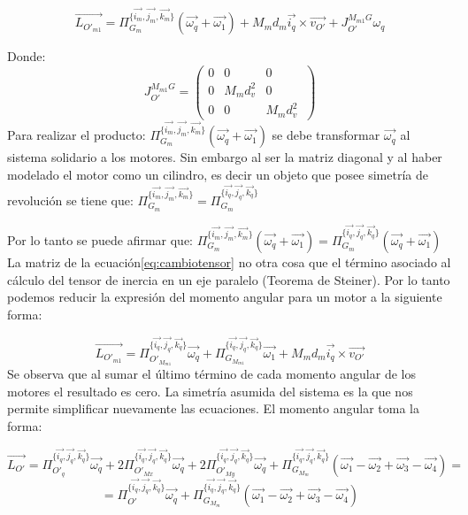 \documentclass[main]{subfiles}
\begin{document}
$$
\vec{L_{O\prime_{m1}}}= \Pi_{G_m}^{\{\vec{i_m}, \vec{j_m}, \vec{k_m}\}}(\vec{\omega_q}+\vec{\omega_1})+M_md_m\vec{i_q}\times \vec{v_{O\prime}}+J_{O\prime}^{M_{m1}G}\omega_q
$$

Donde: 
\begin{equation}
\label{eq:cambiotensor}
J_{O\prime}^{M_{m1}G}=\left(\begin{array}{ccc}
0 &0 &0 \\
0 &M_md_v^2 &0\\
0 & 0 &M_md_v^2\

\end{array}\right)
\end{equation}
Para realizar el producto:
$
\Pi_{G_m}^{\{\vec{i_m}, \vec{j_m}, \vec{k_m}\}}(\vec{\omega_q}+\vec{\omega_1})
$ se debe transformar $\vec{\omega_q}$ al sistema solidario a los motores.  
Sin embargo al ser la matriz diagonal y al haber modelado el motor como un cilindro, es decir un objeto que posee simetr\'ia de revoluci\'on se tiene que:  $\Pi_{G_m}^{\{\vec{i_m}, \vec{j_m}, \vec{k_m}\}} = \Pi_{G_m}^{\{\vec{i_q}, \vec{j_q}, \vec{k_q}\}}$

Por lo tanto se puede afirmar que:
$\Pi_{G_m}^{\{\vec{i_m}, \vec{j_m}, \vec{k_m}\}}(\vec{\omega_q}+\vec{\omega_1})=\Pi_{G_m}^{\{\vec{i_q}, \vec{j_q}, \vec{k_q}\}}(\vec{\omega_q}+\vec{\omega_1})$
La matriz de la ecuaci\'on\ref{eq:cambiotensor} no otra cosa que el t\'ermino asociado al c\'alculo del tensor de inercia en un eje paralelo (Teorema de Steiner). Por lo tanto podemos reducir la expresi\'on del momento angular para un motor a la siguiente forma:




$$\vec{L_{O\prime_{m1}}}= \Pi_{O\prime_{M_{m1}}}^{\{\vec{i_q}, \vec{j_q}, \vec{k_q}\}}\vec{\omega_q}+\Pi_{G_{M_{m1}}}^{\{\vec{i_q}, \vec{j_q}, \vec{k_q}\}}\vec{\omega_1}+M_md_m\vec{i_q}\times \vec{v_{O\prime}}
$$
Se observa que al sumar el \'ultimo t\'ermino de cada momento angular de los motores el resultado es cero. La simetr\'ia asumida del sistema es la que nos permite simplificar nuevamente las ecuaciones. El momento angular toma la forma:

$$\vec{L_{O\prime}} =\Pi_{O\prime_q}^{\{\vec{i_q}, \vec{j_q}, \vec{k_q}\}}\vec{\omega_q}+2\Pi_{O\prime_{Mx}}^{\{\vec{i_q}, \vec{j_q}, \vec{k_q}\}}\vec{\omega_q}+2\Pi_{O\prime_{My}}^{\{\vec{i_q}, \vec{j_q}, \vec{k_q}\}}\vec{\omega_q}+\Pi_{G_{M_{m}}}^{\{\vec{i_q}, \vec{j_q}, \vec{k_q}\}}(\vec{\omega_1}-\vec{\omega_2}+\vec{\omega_3}-\vec{\omega_4})=$$
$$=\Pi_{O\prime}^{\{\vec{i_q}, \vec{j_q}, \vec{k_q}\}}\vec{\omega_q}+\Pi_{G_{M_{m}}}^{\{\vec{i_q}, \vec{j_q}, \vec{k_q}\}}(\vec{\omega_1}-\vec{\omega_2}+\vec{\omega_3}-\vec{\omega_4})$$\\
\end{document}
